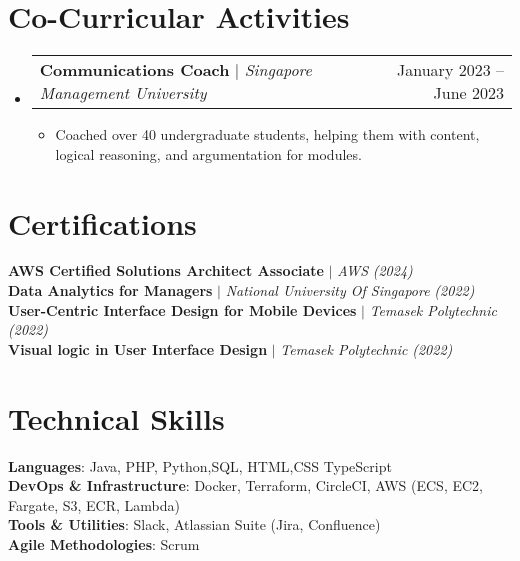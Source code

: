 \documentclass[letterpaper,11pt]{article}
\makeatletter
\newcommand{\resumeItem}[1]{
  \item\small{
    {#1 \vspace{-2pt}}
  }
}
\newcommand{\resumeProjectHeading}[2]{
    \item
    \begin{tabular*}{0.97\textwidth}{l@{\extracolsep{\fill}}r}
      \small#1 & #2 \\
    \end{tabular*}\vspace{-7pt}
}
\newcommand{\resumeSubHeadingListStart}{\begin{itemize}[leftmargin=0.15in, label={}]}
\newcommand{\resumeSubHeadingListEnd}{\end{itemize}}
\newcommand{\resumeItemListStart}{\begin{itemize}}
\newcommand{\resumeItemListEnd}{\end{itemize}\vspace{-5pt}}
\makeatother
\begin{document}
\section{Co-Curricular Activities}
  \resumeSubHeadingListStart
    \resumeProjectHeading
      {\textbf{Communications Coach} $|$ \emph{Singapore Management University}}{January 2023 -- June 2023}
    \resumeItemListStart
      \resumeItem{Coached over 40 undergraduate students, helping them with content, logical reasoning, and argumentation for modules.}
    \resumeItemListEnd
  \resumeSubHeadingListEnd

\section{Certifications}
 \begin{itemize}[leftmargin=0.15in, label={}]
    \small{\item{
     \textbf{AWS Certified Solutions Architect Associate}  $|$ \emph{AWS} \emph{(2024)} \\
     \textbf{Data Analytics for Managers} $|$ \emph{National University Of Singapore} \emph{(2022)} \\
     \textbf{User-Centric Interface Design for Mobile Devices}  $|$ \emph{Temasek Polytechnic} \emph{(2022)} \\
     \textbf{Visual logic in User Interface Design}  $|$ \emph{Temasek Polytechnic} \emph{(2022)} \\
    }}
 \end{itemize}

\section{Technical Skills}
 \begin{itemize}[leftmargin=0.15in, label={}]
    \small{\item{
     \textbf{Languages}{: Java, PHP, Python,SQL, HTML,CSS TypeScript} \\
     \textbf{DevOps \& Infrastructure}{: Docker, Terraform, CircleCI, AWS (ECS, EC2, Fargate, S3, ECR, Lambda)} \\
     \textbf{Tools \& Utilities}{: Slack, Atlassian Suite (Jira, Confluence)} \\
     \textbf{Agile Methodologies}{: Scrum }
    }}
 \end{itemize}
\end{document}
